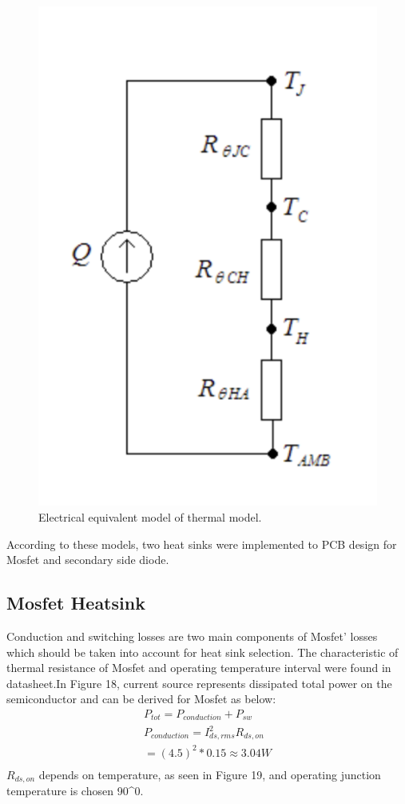 \documentclass{article}
\begin{document}
\begin{figure}[H]
    \centering
    \includegraphics[scale=0.5]{thermal2.png}
    \caption{Electrical equivalent model of thermal model.}
    \label{fig:my_label}
\end{figure}
\newpage

According to these models, two heat sinks were implemented to PCB design for Mosfet and secondary side diode. 
\subsection{Mosfet Heatsink }
Conduction and switching losses are two main components of Mosfet' losses which should be taken into account for heat sink selection. The characteristic of thermal resistance of Mosfet and operating temperature interval were found in datasheet.In Figure 18, current source represents dissipated total power on the semiconductor and can be derived for Mosfet  as below: 
\begin{gather*}
    P_{tot}=P_{conduction}+P_{sw}\\
    P_{conduction}=I_{ds, rms}^2R_{ds,on}\\
    =(4.5)^2*0.15\approx3.04W\\
\end{gather*}
$R_{ds,on}$ depends on temperature, as seen in Figure 19, and operating junction temperature is chosen  90^0.
\end{document}
